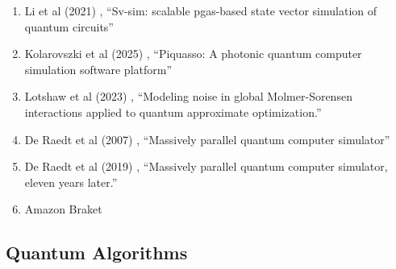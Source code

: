 \documentclass[a4paper,fleqn]{cas-sc}
\begin{document}
\begin{enumerate}
\item Li et al (2021) \cite{li2021sv}, ``Sv-sim: scalable pgas-based state vector simulation of quantum circuits''
\item Kolarovszki et al (2025) \cite{kolarovszki2025piquasso}, ``Piquasso: A photonic quantum computer simulation software platform''
\item Lotshaw et al (2023) \cite{PhysRevA.107.062406}, ``Modeling noise in global Molmer-Sorensen interactions applied to quantum approximate optimization.''
\item De Raedt et al (2007) \cite{de2019massively}, ``Massively parallel quantum computer simulator''
\item De Raedt et al (2019) \cite{de2019massively}, ``Massively parallel quantum computer simulator, eleven years later.''
\item Amazon Braket
\end{enumerate}

\subsection{Quantum Algorithms}
\end{document}
